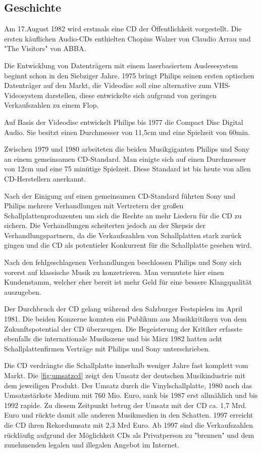 \subsection{Geschichte}

Am 17.August 1982 wird erstmals eine CD der Öffentlichkeit vorgestellt. Die
ersten käuflichen Audio-CDs enthielten Chopins Walzer von Claudio Arrau und
"The Visitors" von ABBA.

Die Entwicklung von Datenträgern mit einem laserbasiertem Auslesesystem beginnt
schon in den Siebziger Jahre. 1975 bringt Philips seinen ersten optischen
Datenträger auf den Markt, die Videodisc soll eine alternative zum
VHS-Videosystem darstellen, diese entwickelte sich aufgrund von geringen
Verkaufszahlen zu einem Flop.

Auf Basis der Videodisc entwickelt Philips bis 1977 die Compact Disc Digital
Audio. Sie besitzt einen Durchmesser von 11,5cm und eine Spielzeit von 60min.

Zwischen 1979 und 1980 arbeiteten die beiden Musikgiganten Philips und Sony an
einem gemeinsamen CD-Standard. Man einigte sich auf einen Durchmesser von 12cm
und eine 75 minütige Spielzeit. Diese Standard ist bis heute von allen
CD-Herstellern anerkannt.

Nach der Einigung auf einen gemeinsamen CD-Standard führten Sony und Philips
mehrere Verhandlungen mit Vertretern der großen Schallplattenproduzenten um sich
die Rechte an mehr Liedern für die CD zu sichern. Die Verhandlungen scheiterten
jedoch an der Skepsis der Verhandlungspartnern, da die Verkaufszahlen von
Schallplatten stark zurück gingen und die CD als potentieler Konkurrent für die
Schallplatte gesehen wird.

Nach den fehlgeschlagenen Verhandlungen beschlossen Philips und Sony sich
vorerst auf klassische Musik zu konzetrieren. Man vermutete hier einen
Kundenstamm, welcher eher bereit ist mehr Geld für eine bessere Klangqualität
auszugeben.

Der Durchbruch der CD gelang während den Salzburger Festspielen im April 1981.
Die beiden Konzerne konnten ein Publikum aus Musikkritikern von dem
Zukunftspotential der CD überzeugen. Die Begeisterung der Kritiker erfasste
ebenfalls die internationale Musikszene und bis März 1982 hatten acht
Schallplattenfirmen Verträge mit Philips und Sony unterschrieben.

Die CD verdrängte die Schallplatte innerhalb weniger Jahre fast komplett vom
Markt. Die \autoref{fig:umsatzcd} zeigt den Umsatz der deutschen Musikindustrie
mit dem jeweiligen Produkt. Der Umsatz durch die Vinylschallplatte, 1980 noch
das Umsatzstärkste Medium mit 760 Mio. Euro, sank bis 1987 erst allmählich und
bis 1992 rapide. Zu diesem Zeitpunkt betrug der Umsatz mit der CD ca. 1,7 Mrd.
Euro und rückte damit alle anderen Musikmedien in den Schatten. 1997 erreicht
die CD ihren Rekordumsatz mit 2,3 Mrd Euro. Ab 1997 sind die Verkaufszahlen
rückläufig aufgrund der Möglichkeit CDs als Privatperson zu
"brennen" und dem zunehmenden legalen und
illegalen Angebot im Internet.

